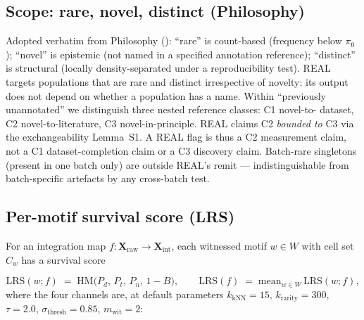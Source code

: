 %

\subsection{Scope: rare, novel, distinct (Philosophy)}
\label{sec:methods-scope}

Adopted verbatim from Philosophy ():
``rare'' is count-based (frequency below $\pi_0$); ``novel'' is epistemic
(not named in a specified annotation reference); ``distinct'' is structural
(locally density-separated under a reproducibility test). REAL targets
populations that are rare and distinct irrespective of novelty: its output
does not depend on whether a population has a name. Within ``previously
unannotated'' we distinguish three nested reference classes: C1 novel-to-
dataset, C2 novel-to-literature, C3 novel-in-principle. REAL claims C2
\emph{bounded to} C3 via the exchangeability Lemma~S1. A REAL flag is
thus a C2 measurement claim, not a C1 dataset-completion claim or a C3
discovery claim.  Batch-rare singletons (present in one batch only) are
outside REAL's remit --- indistinguishable from batch-specific artefacts
by any cross-batch test.

\subsection{Per-motif survival score (LRS)}
\label{sec:methods-lrs}

For an integration map $f:\mathbf{X}_{\text{raw}} \to \mathbf{X}_{\text{int}}$,
each witnessed motif $w \in W$ with cell set $C_w$ has a survival score

\begin{equation}
\mathrm{LRS}(w;f) \;=\; \mathrm{HM}\bigl(P_d,\,P_t,\,P_n,\,1 - B\bigr),
\qquad
\mathrm{LRS}(f) \;=\; \mathrm{mean}_{w \in W}\,\mathrm{LRS}(w;f),
\end{equation}
where the four channels are, at default parameters $k_{\mathrm{kNN}} = 15$,
$k_{\mathrm{rarity}} = 300$, $\tau = 2.0$, $\sigma_{\mathrm{thresh}} = 0.85$,
$m_{\mathrm{wit}} = 2$:

